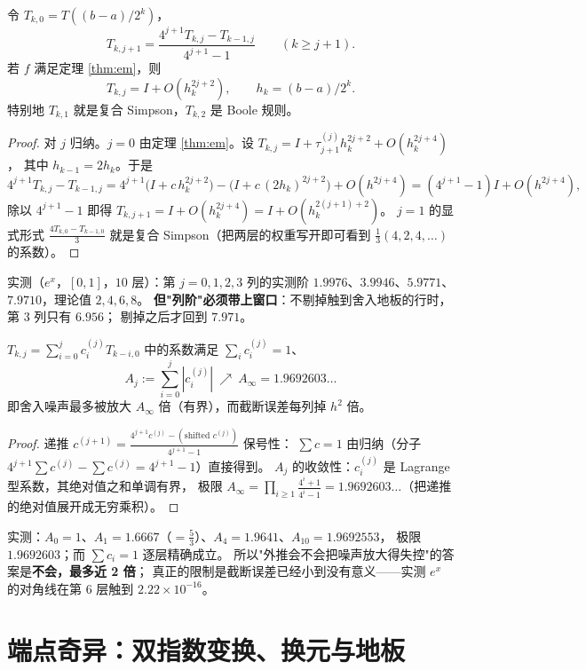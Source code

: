 \begin{theorem}
\label{thm:romberg}
令 $T_{k,0}=T((b-a)/2^k)$，
\[
  T_{k,j+1}=\frac{4^{j+1}T_{k,j}-T_{k-1,j}}{4^{j+1}-1}\qquad(k\ge j+1).
\]
若 $f$ 满足定理 \ref{thm:em}，则
\[
  T_{k,j}=I+O(h_k^{2j+2}),\qquad h_k=(b-a)/2^k .
\]
特别地 $T_{k,1}$ 就是复合 Simpson，$T_{k,2}$ 是 Boole 规则。
\end{theorem}

\begin{proof}
对 $j$ 归纳。$j=0$ 由定理 \ref{thm:em}。设 $T_{k,j}=I+\tau_{j+1}^{(j)}h_k^{2j+2}+O(h_k^{2j+4})$，
其中 $h_{k-1}=2h_k$。于是
\[
  4^{j+1}T_{k,j}-T_{k-1,j}
  =4^{j+1}\bigl(I+c\,h_k^{2j+2}\bigr)-\bigl(I+c\,(2h_k)^{2j+2}\bigr)+O(h^{2j+4})
  =(4^{j+1}-1)I+O(h^{2j+4}),
\]
除以 $4^{j+1}-1$ 即得 $T_{k,j+1}=I+O(h_k^{2j+4})=I+O(h_k^{2(j+1)+2})$。
$j=1$ 的显式形式 $\frac{4T_{k,0}-T_{k-1,0}}{3}$ 就是复合 Simpson（把两层的权重写开即可看到
$\tfrac13(4,2,4,\dots)$ 的系数）。
\end{proof}

实测（$e^x$，$[0,1]$，$10$ 层）：第 $j=0,1,2,3$ 列的实测阶
$1.9976$、$3.9946$、$5.9771$、$7.9710$，理论值 $2,4,6,8$。
\textbf{但"列阶"必须带上窗口}：不剔掉触到舍入地板的行时，第 $3$ 列只有 $6.956$；
剔掉之后才回到 $7.971$。

\begin{theorem}[外推的代价]
\label{thm:amp}
$T_{k,j}=\sum_{i=0}^{j}c_i^{(j)}T_{k-i,0}$ 中的系数满足
$\sum_ic_i^{(j)}=1$、
\[
  A_j:=\sum_{i=0}^{j}|c_i^{(j)}|\ \nearrow\ A_\infty=1.9692603\ldots
\]
即舍入噪声最多被放大 $A_\infty$ 倍（有界），而截断误差每列掉 $h^2$ 倍。
\end{theorem}

\begin{proof}
递推 $c^{(j+1)}=\frac{4^{j+1}c^{(j)}-(\text{shifted }c^{(j)})}{4^{j+1}-1}$ 保号性：
$\sum c=1$ 由归纳（分子 $4^{j+1}\sum c^{(j)}-\sum c^{(j)}=4^{j+1}-1$）直接得到。
$A_j$ 的收敛性：$c_i^{(j)}$ 是 Lagrange 型系数，其绝对值之和单调有界，
极限 $A_\infty=\prod_{i\ge1}\frac{4^i+1}{4^i-1}=1.9692603\ldots$（把递推的绝对值展开成无穷乘积）。
\end{proof}

实测：$A_0=1$、$A_1=1.6667$（$=\tfrac53$）、$A_4=1.9641$、$A_{10}=1.9692553$，
极限 $1.9692603$；而 $\sum c_i=1$ 逐层精确成立。
所以"外推会不会把噪声放大得失控"的答案是\textbf{不会，最多近 2 倍}；
真正的限制是截断误差已经小到没有意义——实测 $e^x$ 的对角线在第 $6$ 层触到 $2.22\times10^{-16}$。

\section{端点奇异：双指数变换、换元与地板}


